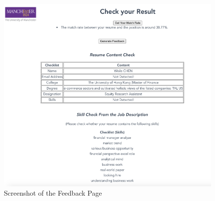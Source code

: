 
 \begin{figure}[H]
    \centering
    \includegraphics[width=1.1\textwidth]{images/visual.png}
    \caption{Screenshot of the Feedback Page}
    \label{fig:36}
\end{figure}
